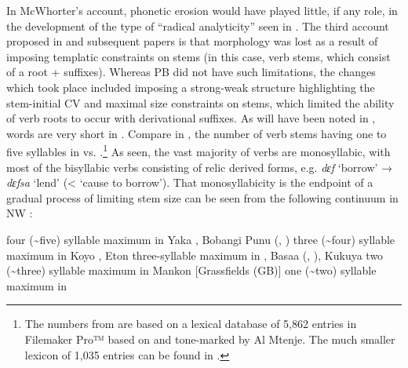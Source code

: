 \documentclass[output=paper]{langsci/langscibook}
\begin{document}
\begin{table}
\caption{Syllable length of verb stems in Chichewa vs. Nzadi}
\label{tab:hyman:ex5}
\end{table}


In McWhorter’s account, phonetic erosion would have played little, if any role, in the development of the type of “radical analyticity” seen in .
  The third account proposed in \citet{Hyman2004} and subsequent papers is that morphology was lost as a result of imposing templatic constraints on stems (in this case, verb stems, which consist of a root + suffixes). Whereas PB did not have such limitations, the changes which took place included imposing a strong-weak structure highlighting the stem-initial CV and maximal size constraints on stems, which limited the ability of verb roots to occur with derivational suffixes. As will have been noted in , words are very short in . Compare in , the number of verb stems having one to five syllables in  vs. .\footnote{The numbers from  are based on a lexical database of 5,862 entries in Filemaker Pro™ based on \citet{Scott1970} and tone-marked by Al Mtenje. The much smaller  lexicon of 1,035 entries can be found in \citep[281--298]{CraneEtAl2011}.}
As seen, the vast majority of  verbs are monosyllabic, with most of the bisyllabic verbs consisting of relic derived forms, e.g. \textit{dɛf} ‘borrow’ → \textit{dɛfsa} ‘lend’ ({\textless} ‘cause to borrow’). That monosyllabicity is the endpoint of a gradual process of limiting stem size can be seen from the following continuum in NW :

\ea
\label{ex:hyman:6}
\ea 
four ({\textasciitilde}five) syllable maximum in   Yaka \citep{Hyman1998}, Bobangi \citep{Whitehead1899}
Punu (\citealt{Fontaney1980}, \citealt{Blanchon1995})
\ex 
three ({\textasciitilde}four) syllable maximum in Koyo \citep{Hyman2004}, Eton \citep{VandeVelde2008}
\ex 
three-syllable maximum  in    \citep{Ellington1977}, Basaa (\citealt{Lemb1973}, \citealt{Hyman2003}), Kukuya \citep{Paulian1975}
\ex 
two ({\textasciitilde}three) syllable maximum   in  Mankon [Grassfields  (GB)] \citep{Leroy1982} 
\ex 
one ({\textasciitilde}two) syllable maximum in   \citep{CraneEtAl2011}
\z 
\z
\end{document}
